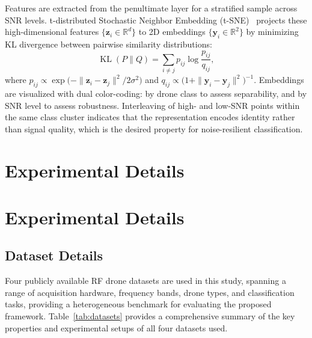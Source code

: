 \documentclass[runningheads]{llncs}
\begin{document}
Features are extracted from the penultimate layer for a stratified sample across SNR levels. t-distributed Stochastic Neighbor Embedding (t-SNE)~\cite{ref33} projects these high-dimensional features $\{\mathbf{z}_i \in \mathbb{R}^d\}$ to 2D embeddings $\{\mathbf{y}_i \in \mathbb{R}^2\}$ by minimizing KL divergence between pairwise similarity distributions:
\begin{equation}
  \operatorname{KL}(P\|Q) = \sum_{i \neq j} p_{ij}
  \log \frac{p_{ij}}{q_{ij}},
\end{equation}
where $p_{ij} \propto \exp\!\bigl(-\|\mathbf{z}_i - \mathbf{z}_j\|^2 / 2\sigma^2\bigr)$ and $q_{ij} \propto \bigl(1 + \|\mathbf{y}_i - \mathbf{y}_j\|^2\bigr)^{-1}$. Embeddings are visualized with dual color-coding: by drone class to assess separability, and by SNR level to assess robustness. Interleaving of high- and low-SNR points within the same class cluster indicates that the representation encodes identity rather than signal quality, which is the desired property for noise-resilient classification.

\section{Experimental Details}
\section{Experimental Details}
\subsection{Dataset Details}

Four publicly available RF drone datasets are used in this study, spanning
a range of acquisition hardware, frequency bands, drone types, and
classification tasks, providing a heterogeneous benchmark for evaluating
the proposed framework. Table~\ref{tab:datasets} provides a comprehensive summary of the key properties and experimental setups of all four datasets used.
\end{document}
